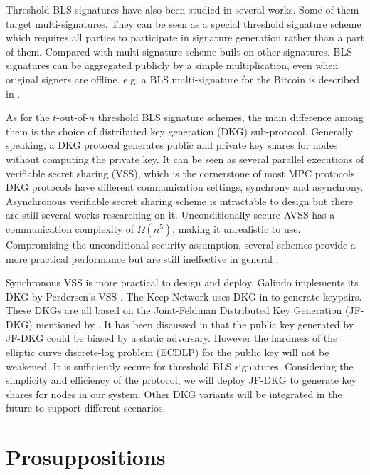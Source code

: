 \documentclass[11pt]{article}
\begin{document}
Threshold BLS signatures have also been studied in several works. Some of them target multi-signatures. They can be seen as a special threshold signature scheme which requires all parties to participate in signature generation rather than a part of them. Compared with multi-signature scheme built on other signatures, BLS signatures can be aggregated publicly by a simple multiplication, even when original signers are offline. e.g. a BLS multi-signature for the Bitcoin is described in \cite{boneh2018compact}. 

As for the $t$-out-of-$n$ threshold BLS signature schemes, the main difference among them is the choice of distributed key generation (DKG) sub-protocol. Generally speaking, a DKG protocol generates public and private key shares for nodes without computing the private key. It can be seen as several parallel executions of verifiable secret sharing (VSS), which is the cornerstone of most MPC protocols. DKG protocols have different communication settings, synchrony and asynchrony. Asynchronous verifiable secret sharing scheme is intractable to design but there are still several works researching on it. Unconditionally secure AVSS has a communication complexity of $\Omega(n^5)$, making it unrealistic to use. Compromising the unconditional security assumption, several schemes provide a more practical performance but are still ineffective in general \cite{kate2012distributed}.

Synchronous VSS is more practical to design and deploy, Galindo \cite{galindo2021fully} implements its DKG by Perdersen's VSS \cite{pedersen1991threshold}. The Keep Network \cite{keep2022doc} uses DKG in \cite{gennaro2007secure} to generate keypairs. These DKGs are all based on the Joint-Feldman Distributed Key Generation (JF-DKG) mentioned by \cite{pedersen1991non}. It has been discussed in \cite{gennaro2007secure} that the public key generated by JF-DKG could be biased by a static adversary. However the hardness of the elliptic curve discrete-log problem (ECDLP) for the public key will not be weakened. It is sufficiently secure for threshold BLS signatures. Considering the simplicity and efficiency of the protocol, we will deploy JF-DKG to generate key shares for nodes in our system. Other DKG variants will be integrated in the future to support different scenarios.

\section{Prosuppositions}
\end{document}

